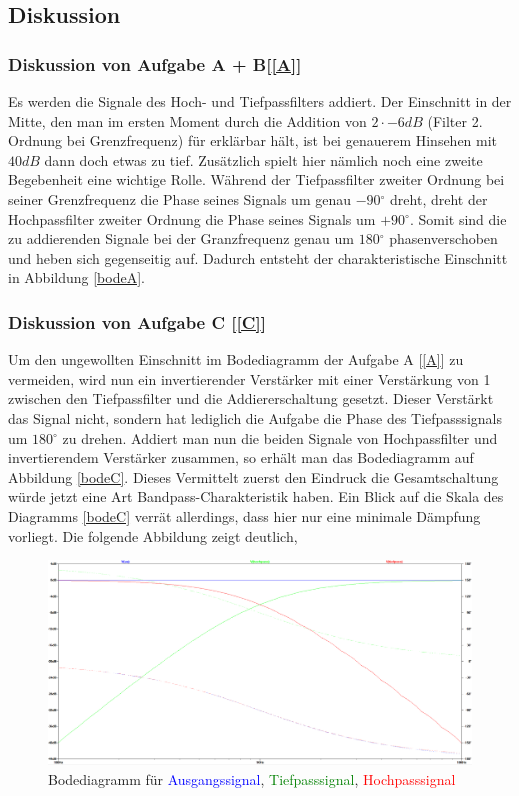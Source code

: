 \newpage
\subsection{Diskussion}
\subsubsection{Diskussion von Aufgabe A + B[\ref{A}]}
Es werden die Signale des Hoch- und Tiefpassfilters addiert. Der Einschnitt in der Mitte, den man im ersten Moment durch die Addition von $2\cdot \si{-6}{dB}$ (Filter 2. Ordnung bei Grenzfrequenz) für erklärbar hält, ist bei genauerem Hinsehen mit $\si{40}{dB}$ dann doch etwas zu tief. Zusätzlich spielt hier nämlich noch eine zweite Begebenheit eine wichtige Rolle. Während der Tiefpassfilter zweiter Ordnung bei seiner Grenzfrequenz die Phase seines Signals um genau $\si{-90}{^{\circ}}$ dreht, dreht der Hochpassfilter zweiter Ordnung die Phase seines Signals um $\si{+90}{^{\circ}}$. Somit sind die zu addierenden Signale bei der Granzfrequenz genau um $\si{180}{^{\circ}}$ phasenverschoben und heben sich gegenseitig auf. Dadurch entsteht der charakteristische Einschnitt in Abbildung \ref{bodeA}.

\subsubsection{Diskussion von Aufgabe C [\ref{C}]}
Um den ungewollten Einschnitt im Bodediagramm der Aufgabe A [\ref{A}] zu vermeiden, wird nun ein invertierender Verstärker mit einer Verstärkung von 1 zwischen den Tiefpassfilter und die Addiererschaltung gesetzt. Dieser Verstärkt das Signal nicht, sondern hat lediglich die Aufgabe die Phase des Tiefpasssignals um $\si{180}{^{\circ}}$ zu drehen. Addiert man nun die beiden Signale von Hochpassfilter und invertierendem Verstärker zusammen, so erhält man das Bodediagramm auf Abbildung \ref{bodeC}.
Dieses Vermittelt zuerst den Eindruck die Gesamtschaltung würde jetzt eine Art Bandpass-Charakteristik haben. Ein Blick auf die Skala des Diagramms \ref{bodeC} verrät allerdings, dass hier nur eine minimale Dämpfung vorliegt. Die folgende Abbildung zeigt deutlich,

\begin{figure}[h]
\centering
\includegraphics[width=16cm]{pics/Bode_vergleich}
\caption{Bodediagramm für \textcolor{blue}{Ausgangssignal}, \textcolor{green}{Tiefpasssignal}, \textcolor{red}{Hochpasssignal}}
\label{vergleich}
\end{figure}


